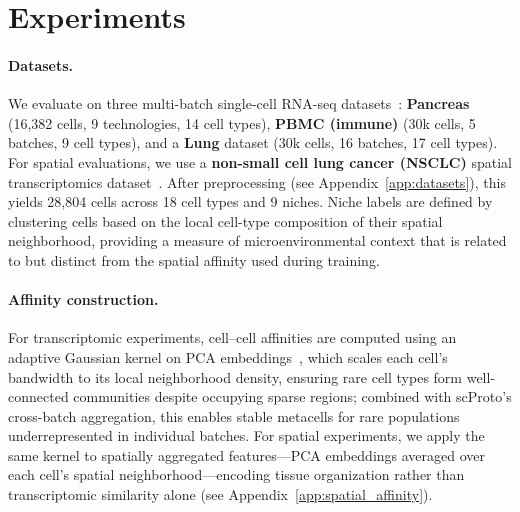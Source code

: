 \section{Experiments}

\paragraph{Datasets.}
We evaluate on three multi-batch single-cell RNA-seq datasets~\citep{luecken2020benchmarking}:
\textbf{Pancreas} (16,382 cells, 9 technologies, 14 cell types),
\textbf{PBMC (immune)} (30k cells, 5 batches, 9 cell types),
and a \textbf{Lung} dataset (30k cells, 16 batches, 17 cell types).
For spatial evaluations, we use a \textbf{non-small cell lung cancer (NSCLC)} spatial transcriptomics dataset~\citep{pentimalli2025combining}.
After preprocessing (see Appendix~\ref{app:datasets}), this yields 28,804 cells across 18 cell types and 9 niches.
Niche labels are defined by clustering cells based on the local cell-type composition of their spatial neighborhood, providing a measure of microenvironmental context that is related to but distinct from the spatial affinity used during training.

\paragraph{Affinity construction.}
For transcriptomic experiments, cell--cell affinities are computed using an adaptive Gaussian kernel on PCA embeddings~\citep{seacells}, which scales each cell's bandwidth to its local neighborhood density, ensuring rare cell types form well-connected communities despite occupying sparse regions; combined with scProto's cross-batch aggregation, this enables stable metacells for rare populations underrepresented in individual batches.
For spatial experiments, we apply the same kernel to spatially aggregated features---PCA embeddings averaged over each cell's spatial neighborhood---encoding tissue organization rather than transcriptomic similarity alone (see Appendix~\ref{app:spatial_affinity}).

